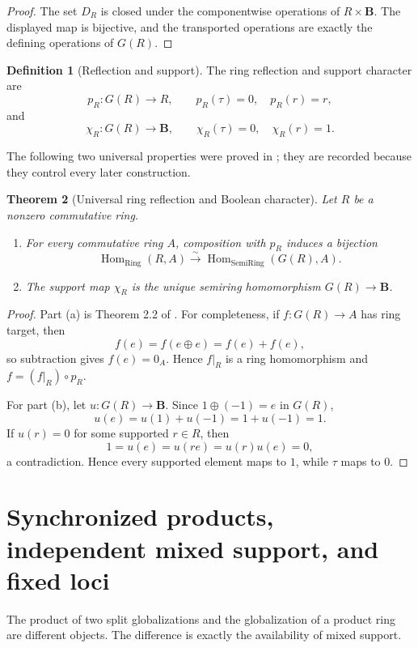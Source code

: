 \documentclass[11pt]{amsart}
\numberwithin{equation}{section}
\newtheorem{theorem}{Theorem}[section]
\theoremstyle{definition}
\newtheorem{definition}[theorem]{Definition}
\newcommand{\B}{\mathbf B}
\newcommand{\Hom}{\operatorname{Hom}}
\DeclareMathOperator{\Ring}{Ring}
\DeclareMathOperator{\SemiRing}{SemiRing}
\begin{document}
\begin{proof}
The set $D_R$ is closed under the componentwise operations of $R\times\B$.  The displayed map is bijective, and the transported operations are exactly the defining operations of $G(R)$.
\end{proof}

\begin{definition}[Reflection and support]
The ring reflection and support character are
\[
p_R:G(R)\longrightarrow R,
\qquad
p_R(\tau)=0,
\quad
p_R(r)=r,
\]
and
\[
\chi_R:G(R)\longrightarrow\B,
\qquad
\chi_R(\tau)=0,
\quad
\chi_R(r)=1.
\]
\end{definition}

The following two universal properties were proved in \cite{Secondary}; they are recorded because they control every later construction.

\begin{theorem}[Universal ring reflection and Boolean character]\label{thm:universal-maps}
Let $R$ be a nonzero commutative ring.
\begin{enumerate}[label=\textup{(\alph*)}]
\item For every commutative ring $A$, composition with $p_R$ induces a bijection
\[
\Hom_{\Ring}(R,A)
\xrightarrow{\sim}
\Hom_{\SemiRing}(G(R),A).
\]
\item The support map $\chi_R$ is the unique semiring homomorphism $G(R)\to\B$.
\end{enumerate}
\end{theorem}

\begin{proof}
Part (a) is Theorem 2.2 of \cite{Secondary}.  For completeness, if $f:G(R)\to A$ has ring target, then
\[
f(e)=f(e\oplus e)=f(e)+f(e),
\]
so subtraction gives $f(e)=0_A$.  Hence $f|_R$ is a ring homomorphism and $f=(f|_R)\circ p_R$.

For part (b), let $u:G(R)\to\B$.  Since $1\oplus(-1)=e$ in $G(R)$,
\[
u(e)=u(1)+u(-1)=1+u(-1)=1.
\]
If $u(r)=0$ for some supported $r\in R$, then
\[
1=u(e)=u(re)=u(r)u(e)=0,
\]
a contradiction.  Hence every supported element maps to $1$, while $\tau$ maps to $0$.
\end{proof}


\section{Synchronized products, independent mixed support, and fixed loci}
\label{sec:synchronized-products}

The product of two split globalizations and the globalization of a product
ring are different objects.  The difference is exactly the availability of
mixed support.
\end{document}
